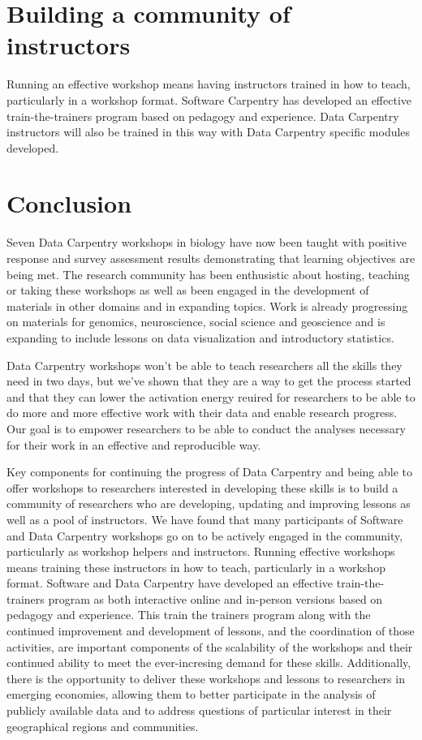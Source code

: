 \documentclass[15]{idcc}
\begin{document}
\begin{itemize}
\section{Building a community of instructors}

Running an effective workshop means having instructors trained in how to teach, particularly in a workshop format. Software Carpentry has developed an effective train-the-trainers program based on pedagogy and experience. Data Carpentry instructors will also be trained in this way with Data Carpentry specific modules developed.






\section{Conclusion}


Seven Data Carpentry workshops in biology have now been taught with positive response and survey 
assessment results demonstrating that learning objectives are being met. The research community 
has been enthusistic about hosting, teaching or taking these workshops as well as been engaged in
 the development of materials in other domains and in expanding topics. Work is already progressing on materials 
for genomics, neuroscience, social science and geoscience and is expanding to include lessons on data visualization and introductory statistics.

Data Carpentry workshops won't be able to teach researchers all the skills they need in two days, but we've shown that 
they are a way to get the process started and that they can lower the activation energy reuired for researchers to be
 able to do more and more effective work with their data and enable research progress. Our goal is to empower 
researchers to be able to conduct the analyses necessary for their work in an effective
and reproducible way.

Key components for continuing the progress of Data Carpentry and being able to offer workshops to researchers interested in developing these
skills is to build a community of researchers who are developing, updating and improving lessons as well as a pool of instructors. We have
found that many participants of Software and Data Carpentry workshops go on to be actively engaged in the community, particularly as workshop
helpers and instructors. Running effective workshops means training these instructors in how to teach, particularly in a workshop format. 
Software and Data Carpentry have developed an effective train-the-trainers program as both interactive online and in-person versions 
based on pedagogy and experience. This train the trainers program along with the continued improvement and development of lessons, and the coordination
 of those activities, are important components of the scalability of the workshops and their continued ability to meet
 the ever-incresing demand for these skills. Additionally, there is the opportunity to deliver these workshops and lessons to researchers in emerging
 economies, allowing them to better participate in the analysis
of publicly available data and to address questions of particular interest in their geographical regions and communities.


\end{itemize}
\end{document}
